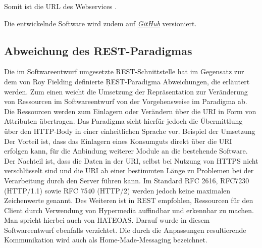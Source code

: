 Somit ist die \ac{URL} des Webservices .

Die entwickelnde Software wird zudem auf \href{https://github.com/lucasmerkel/dhbw-advancedswe-programmentwurf/tree/main/swe_programmentwurf/consumergoods-inventory-planner}{\textit{GitHub}} versioniert.

\subsection*{Abweichung des \ac{REST}-Paradigmas}
Die im Softwareentwurf umgesetzte \ac{REST}-Schnittstelle hat im Gegensatz zur dem von Roy Fielding definierte \c{REST}-Paradigma Abweichungen, die erläutert werden.
Zum einen weicht die Umsetzung der Repräsentation zur Veränderung von Ressourcen im Softwareentwurf von der Vorgehensweise im Paradigma ab.
Die Ressourcen werden zum Einlagern oder Verändern über die \ac{URI} in Form von Attributen übertragen.
Das Paradigma sieht hierfür jedoch die Übermittlung über den \ac{HTTP}-Body in einer einheitlichen Sprache vor.
Beispiel der Umsetzung
Der Vorteil ist, dass das Einlagern eines Konsumguts direkt über die \ac{URI} erfolgen kann, für die Anbindung weiterer Module an die bestehende Software.
Der Nachteil ist, dass die Daten in der \ac{URI}, selbst bei Nutzung von \ac{HTTPS} nicht verschlüsselt sind und die \ac{URI} ab einer bestimmten Länge zu Problemen bei der Verarbeitung durch den Server führen kann.
Im Standard RFC 2616, RFC7230 (HTTP/1.1) sowie RFC 7540 (HTTP/2) werden jedoch keine maximalen Zeichenwerte genannt.
Des Weiteren ist in \ac{REST} empfohlen, Ressourcen für den Client durch Verwendung von Hypermedia auffindbar und erkennbar zu machen.
Man spricht hierbei auch von \ac{HATEOAS}. Darauf wurde in diesem Softwareentwurf ebenfalls verzichtet.
Die durch die Anpassungen resultierende Kommunikation wird auch als Home-Made-Messaging bezeichnet.